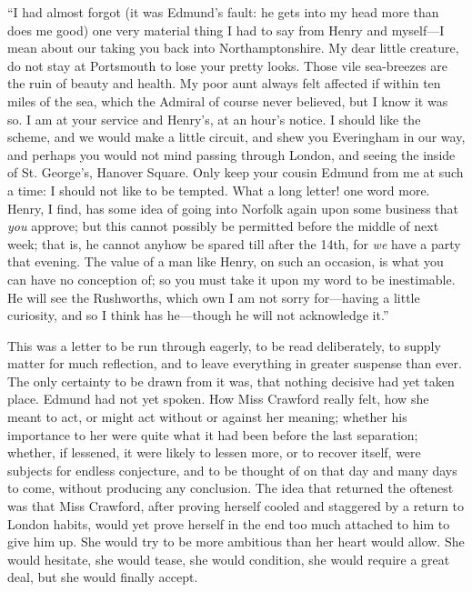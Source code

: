 ``I had almost forgot (it was Edmund's fault:  he gets into
my head more than does me good) one very material thing I
had to say from Henry and myself---I mean about our taking
you back into Northamptonshire.  My dear little creature,
do not stay at Portsmouth to lose your pretty looks.
Those vile sea-breezes are the ruin of beauty and health.
My poor aunt always felt affected if within ten miles
of the sea, which the Admiral of course never believed,
but I know it was so.  I am at your service and Henry's,
at an hour's notice.  I should like the scheme, and we would
make a little circuit, and shew you Everingham in our way,
and perhaps you would not mind passing through London,
and seeing the inside of St. George's, Hanover Square.
Only keep your cousin Edmund from me at such a time:
I should not like to be tempted.  What a long letter!
one word more.  Henry, I find, has some idea of going
into Norfolk again upon some business that \emph{you} approve;
but this cannot possibly be permitted before the middle
of next week; that is, he cannot anyhow be spared till
after the 14th, for \emph{we} have a party that evening.
The value of a man like Henry, on such an occasion,
is what you can have no conception of; so you must take it
upon my word to be inestimable.  He will see the Rushworths,
which own I am not sorry for---having a little curiosity,
and so I think has he---though he will not acknowledge
it.''

This was a letter to be run through eagerly, to be
read deliberately, to supply matter for much reflection,
and to leave everything in greater suspense than ever.
The only certainty to be drawn from it was, that nothing
decisive had yet taken place.  Edmund had not yet spoken.
How Miss Crawford really felt, how she meant to act,
or might act without or against her meaning; whether his
importance to her were quite what it had been before
the last separation; whether, if lessened, it were likely
to lessen more, or to recover itself, were subjects
for endless conjecture, and to be thought of on that day
and many days to come, without producing any conclusion.
The idea that returned the oftenest was that Miss Crawford,
after proving herself cooled and staggered by a return
to London habits, would yet prove herself in the end
too much attached to him to give him up.  She would
try to be more ambitious than her heart would allow.
She would hesitate, she would tease, she would condition,
she would require a great deal, but she would finally
accept.

